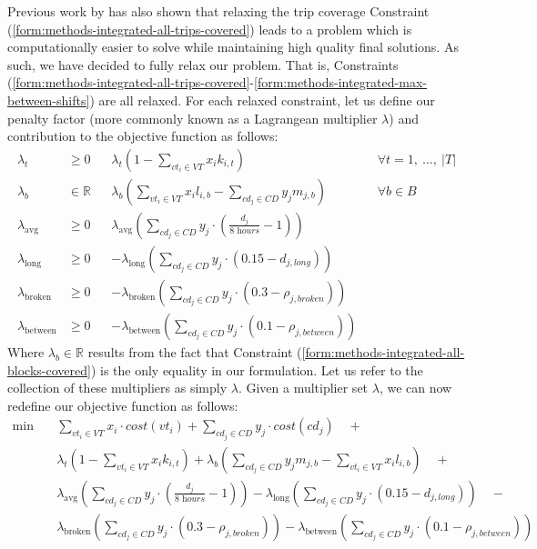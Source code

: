\documentclass[]{article}
\begin{document}
Previous work by \citet{vanKootenNiekerk2017} has also shown that relaxing the trip coverage Constraint (\ref{form:methods-integrated-all-trips-covered}) leads to a problem which is computationally easier to solve while maintaining high quality final solutions. As such, we have decided to fully relax our problem. That is, Constraints (\ref{form:methods-integrated-all-trips-covered}-\ref{form:methods-integrated-max-between-shifts}) are all relaxed. For each relaxed constraint, let us define our penalty factor (more commonly known as a Lagrangean multiplier $\lambda$) and contribution to the objective function as follows: 
\begin{align}
\lambda_{t} &\geq 0 && \lambda_{t} (1 - \sum_{vt_i \in VT} x_{i}k_{i,t}) && \forall t = 1,\:\dots,\:|T| \nonumber \\
\lambda_{b} &\in \mathbb{R} && \lambda_{b} (\sum_{vt_i \in VT} x_i l_{i,b} - \sum_{cd_j \in CD}y_j m_{j,b}) && \forall b \in B \nonumber \\
\lambda_{\text{avg}} &\geq 0 && \lambda_{\text{avg}} (\sum_{cd_j \in \textit{CD}} y_{j} \cdot (\frac{d_{j}}{\textit{8 hours}} - 1)) && \nonumber \\
\lambda_{\text{long}} &\geq 0 && -\lambda_{\text{long}} (\sum_{cd_j \in \textit{CD}} y_{j} \cdot (0.15 - d_{j,\textit{long}})) && \nonumber \\
\lambda_{\text{broken}} &\geq 0 && -\lambda_{\text{broken}} (\sum_{cd_j \in \textit{CD}} y_{j} \cdot (0.3 - \rho_{j,\textit{broken}})) && \nonumber \\
\lambda_{\text{between}} &\geq 0 && -\lambda_{\text{between}} (\sum_{cd_j \in \textit{CD}} y_{j} \cdot (0.1 - \rho_{j,\textit{between}})) && \nonumber
\end{align}
Where $\lambda_b \in \mathbb{R}$ results from the fact that Constraint (\ref{form:methods-integrated-all-blocks-covered}) is the only equality in our formulation. Let us refer to the collection of these multipliers as simply $\lambda$. Given a multiplier set $\lambda$, we can now redefine our objective function as follows:
\begin{align}
\min \quad
& \sum_{vt_i \in VT} x_{i} \cdot cost(vt_i) + \sum_{cd_j \in CD} y_{j} \cdot cost(cd_j)\quad+ \nonumber \\ 
&\lambda_{t} (1 - \sum_{vt_i \in VT} x_{i}k_{i,t}) + \lambda_{b} (\sum_{cd_j \in CD}y_j m_{j,b} - \sum_{vt_i \in VT}x_i l_{i,b}) \quad+\nonumber \\
&\lambda_{\text{avg}} (\sum_{cd_j \in \textit{CD}} y_{j} \cdot (\frac{d_{j}}{\textit{8 hours}} - 1)) -\lambda_{\text{long}} (\sum_{cd_j \in \textit{CD}} y_{j} \cdot (0.15 - d_{j,\textit{long}}))\quad- \nonumber \\
&\lambda_{\text{broken}}(\sum_{cd_j \in \textit{CD}} y_{j} \cdot (0.3 - \rho_{j,\textit{broken}})) -\lambda_{\text{between}} (\sum_{cd_j \in \textit{CD}} y_{j} \cdot (0.1 - \rho_{j,\textit{between}})) \nonumber
\end{align}
\end{document}

